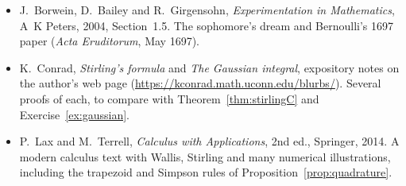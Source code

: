 \begin{itemize}
\item J.~Borwein, D.~Bailey and R.~Girgensohn, \emph{Experimentation in Mathematics}, A~K Peters, 2004, Section~1.5. The sophomore's dream and Bernoulli's 1697 paper (\emph{Acta Eruditorum}, May 1697).
\item K.~Conrad, \emph{Stirling's formula} and \emph{The Gaussian integral}, expository notes on the author's web page (\url{https://kconrad.math.uconn.edu/blurbs/}). Several proofs of each, to compare with Theorem~\ref{thm:stirlingC} and Exercise~\ref{ex:gaussian}.
\item P.~Lax and M.~Terrell, \emph{Calculus with Applications}, 2nd ed., Springer, 2014. A modern calculus text with Wallis, Stirling and many numerical illustrations, including the trapezoid and Simpson rules of Proposition~\ref{prop:quadrature}.
\end{itemize}
